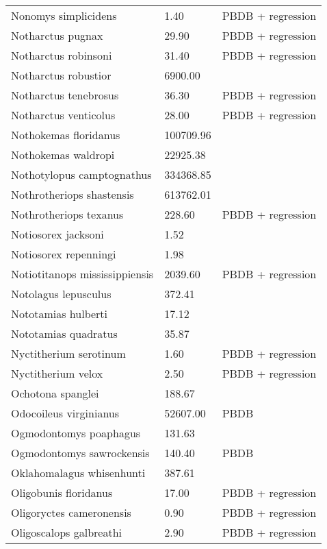 \documentclass{article}
\begin{document}
\begin{center}
\begin{longtable}{p{} p{} p{}}
    Nonomys simplicidens & 1.40 & PBDB + regression \\ 
    Notharctus pugnax & 29.90 & PBDB + regression \\ 
    Notharctus robinsoni & 31.40 & PBDB + regression \\ 
    Notharctus robustior & 6900.00 & \cite{Soligo2006} \\ 
    Notharctus tenebrosus & 36.30 & PBDB + regression \\ 
    Notharctus venticolus & 28.00 & PBDB + regression \\ 
    Nothokemas floridanus & 100709.96 & \cite{Tomiya2013} \\ 
    Nothokemas waldropi & 22925.38 & \cite{Tomiya2013} \\ 
    Nothotylopus camptognathus & 334368.85 & \cite{Tomiya2013} \\ 
    Nothrotheriops shastensis & 613762.01 & \cite{Brook2004a} \\ 
    Nothrotheriops texanus & 228.60 & PBDB + regression \\ 
    Notiosorex jacksoni & 1.52 & \cite{Madden1985} \\ 
    Notiosorex repenningi & 1.98 & \cite{Lillegraven1977} \\ 
    Notiotitanops mississippiensis & 2039.60 & PBDB + regression \\ 
    Notolagus lepusculus & 372.41 & \cite{Tomiya2013} \\ 
    Nototamias hulberti & 17.12 & \cite{Tomiya2013} \\ 
    Nototamias quadratus & 35.87 & \cite{Tomiya2013} \\ 
    Nyctitherium serotinum & 1.60 & PBDB + regression \\ 
    Nyctitherium velox & 2.50 & PBDB + regression \\ 
    Ochotona spanglei & 188.67 & \cite{Tomiya2013} \\ 
    Odocoileus virginianus & 52607.00 & PBDB \\ 
    Ogmodontomys poaphagus & 131.63 & \cite{Tomiya2013} \\ 
    Ogmodontomys sawrockensis & 140.40 & PBDB \\ 
    Oklahomalagus whisenhunti & 387.61 & \cite{Tomiya2013} \\ 
    Oligobunis floridanus & 17.00 & PBDB + regression \\ 
    Oligoryctes cameronensis & 0.90 & PBDB + regression \\ 
    Oligoscalops galbreathi & 2.90 & PBDB + regression \\ 

\end{longtable}
\end{center}
\end{document}
